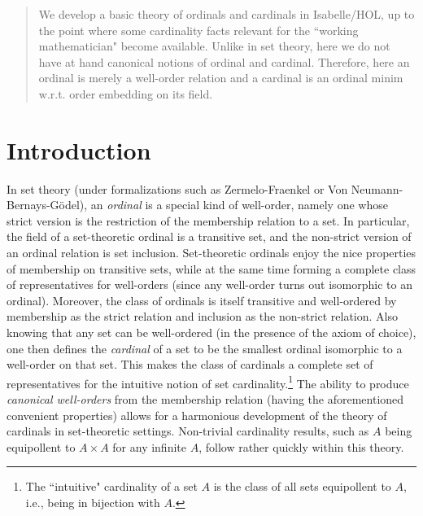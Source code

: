 \newcommand{\eqo}{\mbox{$=\!\!o$}}
\newcommand{\leqo}{\mbox{$\leq\!\!o$}}
\newcommand{\lesso}{\mbox{$<\!\!o$}}


\begin{abstract}
We develop a basic theory of ordinals and cardinals in Isabelle/HOL, up to the 
point where some cardinality facts relevant for the ``working mathematician" become available.  
Unlike in set theory, here we do not have at hand canonical notions of ordinal and cardinal.  
Therefore, here an ordinal is merely a well-order relation and a cardinal is an 
ordinal minim w.r.t. order embedding on its field.  
\end{abstract}



\section{Introduction} 

In set theory (under formalizations such as Zermelo-Fraenkel or Von Neumann-Bernays-G\"{o}del), an 
{\em ordinal} is a special kind of well-order, namely one 
whose strict version is the restriction of the membership relation to a set.  In particular, 
the field of a set-theoretic ordinal is a transitive set, and the non-strict version 
of an ordinal relation is set inclusion. Set-theoretic ordinals enjoy the nice properties 
of membership on transitive sets, while at the same time forming a complete class of 
representatives for well-orders (since any well-order turns out isomorphic to an ordinal).  
Moreover, the class of ordinals is itself transitive and well-ordered by membership as the strict relation 
and inclusion as the non-strict relation.  
Also knowing that any set can be well-ordered (in the presence of the axiom of choice), one then defines 
the {\em cardinal} of a set to be the smallest ordinal isomorphic to a well-order on that set.  
This makes the class of cardinals a complete set of representatives for the intuitive notion 
of set cardinality.\footnote{The ``intuitive" cardinality of a set $A$ is the class of all 
sets equipollent to $A$, i.e., being in bijection with $A$.}  
The ability to produce {\em canonical well-orders} from the membership relation (having the aforementioned 
convenient properties)   
allows for a harmonious development of the theory of cardinals in set-theoretic settings.  
Non-trivial cardinality results, such as $A$ being equipollent to $A \times A$ for any infinite $A$, 
follow rather quickly within this theory.  

